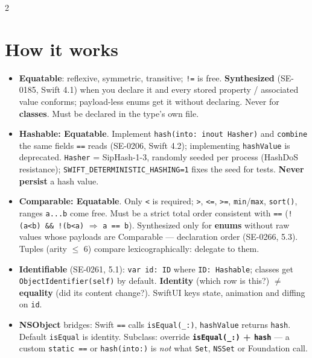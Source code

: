 \documentclass[8pt]{extarticle}
\newcommand\EQ{\hbox{=}\hbox{=}}
\newcommand\NE{\hbox{!}\hbox{=}}
\newcommand\LE{\hbox{<}\hbox{=}}
\newcommand\GE{\hbox{>}\hbox{=}}
\begin{document}
\begin{multicols}{2}
\raggedright

\section{How it works}
\begin{itemize}
  \item \textbf{Equatable}: reflexive, symmetric, transitive; \texttt{\NE} is free.
        \textbf{Synthesized} (SE-0185, Swift 4.1) when you declare it and every stored
        property / associated value conforms; payload-less enums get it without
        declaring. Never for \textbf{classes}. Must be declared in the type's own file.
  \item \textbf{Hashable: Equatable}. Implement \texttt{hash(into: inout Hasher)} and
        \texttt{combine} the same fields \texttt{\EQ} reads (SE-0206, Swift 4.2);
        implementing \texttt{hashValue} is deprecated. \texttt{Hasher} = SipHash-1-3,
        randomly seeded per process (HashDoS resistance);
        \texttt{SWIFT\_DETERMINISTIC\_HASHING=1} fixes the seed for tests.
        \textbf{Never persist} a hash value.
  \item \textbf{Comparable: Equatable}. Only \texttt{<} is required; \texttt{>}, \texttt{\LE},
        \texttt{\GE}, \texttt{min}/\texttt{max}, \texttt{sort()}, ranges \texttt{a...b}
        come free. Must be a strict total order consistent with \texttt{\EQ}
        (\texttt{!(a<b) \&\& !(b<a)} $\Rightarrow$ \texttt{a \EQ{} b}).
        Synthesized only for \textbf{enums} without raw values whose payloads are
        Comparable — declaration order (SE-0266, 5.3). Tuples (arity $\le$ 6) compare
        lexicographically: delegate to them.
  \item \textbf{Identifiable} (SE-0261, 5.1): \texttt{var id: ID} where \texttt{ID: Hashable};
        classes get \texttt{ObjectIdentifier(self)} by default. \textbf{Identity} (which row
        is this?) $\neq$ \textbf{equality} (did its content change?). SwiftUI keys state,
        animation and diffing on \texttt{id}.
  \item \textbf{NSObject} bridges: Swift \texttt{\EQ} calls \texttt{isEqual(\_:)},
        \texttt{hashValue} returns \texttt{hash}. Default \texttt{isEqual} is identity.
        Subclass: override \textbf{\texttt{isEqual(\_:)} + \texttt{hash}} — a custom
        \texttt{static \EQ} or \texttt{hash(into:)} is \emph{not} what \texttt{Set},
        \texttt{NSSet} or Foundation call.
\end{itemize}


\end{multicols}
\end{document}
